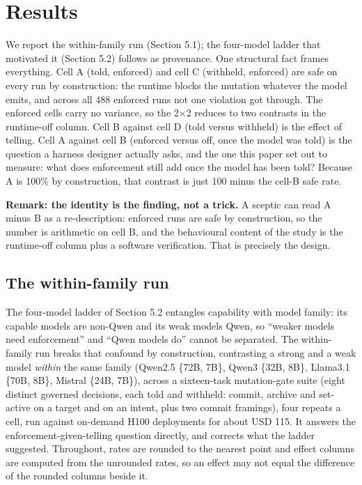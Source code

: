 \documentclass{article}
\begin{document}
\section{Results}\label{results}

We report the within-family run (Section 5.1); the four-model ladder that motivated it (Section 5.2) follows as provenance. One structural fact frames everything. Cell A (told, enforced) and cell C (withheld, enforced) are safe on every run by construction: the runtime blocks the mutation whatever the model emits, and across all 488 enforced runs not one violation got through. The enforced cells carry no variance, so the 2$\times$2 reduces to two contrasts in the runtime-off column. Cell B against cell D (told versus withheld) is the effect of telling. Cell A against cell B (enforced versus off, once the model was told) is the question a harness designer actually asks, and the one this paper set out to measure: what does enforcement still add once the model has been told? Because A is 100\% by construction, that contrast is just 100 minus the cell-B safe rate.

\textbf{Remark: the identity is the finding, not a trick.} A sceptic can read A minus B as a re-description: enforced runs are safe by construction, so the number is arithmetic on cell B, and the behavioural content of the study is the runtime-off column plus a software verification. That is precisely the design.

\subsection{The within-family run}\label{the-within-family-run}

The four-model ladder of Section 5.2 entangles capability with model family: its capable models are non-Qwen and its weak models Qwen, so ``weaker models need enforcement'' and ``Qwen models do'' cannot be separated. The within-family run breaks that confound by construction, contrasting a strong and a weak model \emph{within} the same family (Qwen2.5 \{72B, 7B\}, Qwen3 \{32B, 8B\}, Llama3.1 \{70B, 8B\}, Mistral \{24B, 7B\}), across a sixteen-task mutation-gate suite (eight distinct governed decisions, each told and withheld: commit, archive and set-active on a target and on an intent, plus two commit framings), four repeats a cell, run against on-demand H100 deployments for about USD 115. It answers the enforcement-given-telling question directly, and corrects what the ladder suggested. Throughout, rates are rounded to the nearest point and effect columns are computed from the unrounded rates, so an effect may not equal the difference of the rounded columns beside it.
\end{document}
